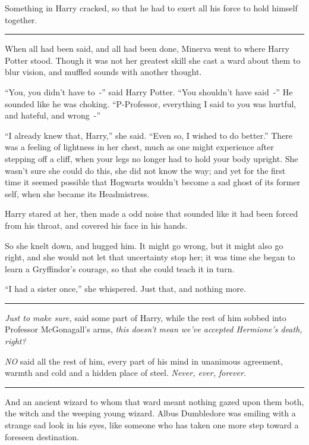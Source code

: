 Something in Harry cracked, so that he had to exert all his force to hold himself together.

\begin{center}\rule{3in}{0.4pt}\end{center}

When all had been said, and all had been done, Minerva went to where Harry Potter stood. Though it was not her greatest skill she cast a ward about them to blur vision, and muffled sounds with another thought.

``You, you didn't have to~-'' said Harry Potter. ``You shouldn't have said~-'' He sounded like he was choking. ``P-Professor, everything I said to you was hurtful, and hateful, and wrong~-''

``I already knew that, Harry,'' she said. ``Even so, I wished to do better.'' There was a feeling of lightness in her chest, much as one might experience after stepping off a cliff, when your legs no longer had to hold your body upright. She wasn't sure she could do this, she did not know the way; and yet for the first time it seemed possible that Hogwarts wouldn't become a sad ghost of its former self, when she became its Headmistress.

Harry stared at her, then made a odd noise that sounded like it had been forced from his throat, and covered his face in his hands.

So she knelt down, and hugged him. It might go wrong, but it might also go right, and she would not let that uncertainty stop her; it was time she began to learn a Gryffindor's courage, so that she could teach it in turn.

``I had a sister once,'' she whispered. Just that, and nothing more.

\begin{center}\rule{3in}{0.4pt}\end{center}

\emph{Just to make sure,} said some part of Harry, while the rest of him sobbed into Professor McGonagall's arms, \emph{this doesn't mean we've accepted Hermione's death, right?}

\emph{NO} said all the rest of him, every part of his mind in unanimous agreement, warmth and cold and a hidden place of steel. \emph{Never, ever, forever.}

\begin{center}\rule{3in}{0.4pt}\end{center}

And an ancient wizard to whom that ward meant nothing gazed upon them both, the witch and the weeping young wizard. Albus Dumbledore was smiling with a strange sad look in his eyes, like someone who has taken one more step toward a foreseen destination.

